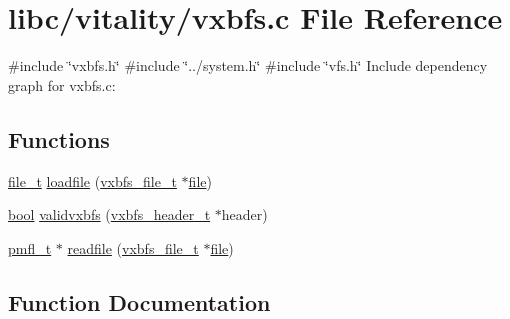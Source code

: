\hypertarget{a00203}{}\section{libc/vitality/vxbfs.c File Reference}
\label{a00203}
{\ttfamily \#include \char`\"{}vxbfs.\+h\char`\"{}}\newline
{\ttfamily \#include \char`\"{}../system.\+h\char`\"{}}\newline
{\ttfamily \#include \char`\"{}vfs.\+h\char`\"{}}\newline
Include dependency graph for vxbfs.\+c\+:
\subsection*{Functions}
\begin{DoxyCompactItemize}
\item 
\hyperlink{a00191_aa5445a6474a23ee3e7756d432dfa4ba1_aa5445a6474a23ee3e7756d432dfa4ba1}{file\+\_\+t} \hyperlink{a00203_afa5caeb58da2ae814ac3adbb167a77fe_afa5caeb58da2ae814ac3adbb167a77fe}{loadfile} (\hyperlink{a00206_abb93e2407af0d8fe0f5629ce6456c6f9_abb93e2407af0d8fe0f5629ce6456c6f9}{vxbfs\+\_\+file\+\_\+t} $\ast$\hyperlink{a00308}{file})
\item 
\hyperlink{a00140_af6a258d8f3ee5206d682d799316314b1_af6a258d8f3ee5206d682d799316314b1}{bool} \hyperlink{a00203_a078a66e7d52fd4a6df768277b605199c_a078a66e7d52fd4a6df768277b605199c}{validvxbfs} (\hyperlink{a00206_ac5678b6d5dd5ed5ca86e5ccd4c30d39d_ac5678b6d5dd5ed5ca86e5ccd4c30d39d}{vxbfs\+\_\+header\+\_\+t} $\ast$header)
\item 
\hyperlink{a00191_a02f7eedc7de6c770b6b29a62905fc61d_a02f7eedc7de6c770b6b29a62905fc61d}{pmfl\+\_\+t} $\ast$ \hyperlink{a00203_a092e5bdd19e8369aa33901fffeb1f025_a092e5bdd19e8369aa33901fffeb1f025}{readfile} (\hyperlink{a00206_abb93e2407af0d8fe0f5629ce6456c6f9_abb93e2407af0d8fe0f5629ce6456c6f9}{vxbfs\+\_\+file\+\_\+t} $\ast$\hyperlink{a00308}{file})
\end{DoxyCompactItemize}


\subsection{Function Documentation}
\mbox{\label{a00203_afa5caeb58da2ae814ac3adbb167a77fe_afa5caeb58da2ae814ac3adbb167a77fe}} 
